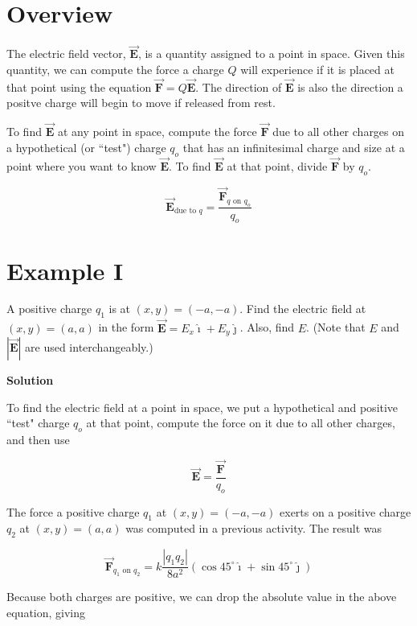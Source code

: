 \documentclass{article}
\newcommand{\ihat}[0]{\hat{\boldsymbol{\imath}}}
\newcommand{\jhat}[0]{\hat{\boldsymbol{\jmath}}}
\newcommand{\bfvec}[1]{\vec{\mathbf{#1}}}
\begin{document}

\section{Overview}

The electric field vector, $\bfvec{E}$, is a quantity assigned to a point in space. Given this quantity, we can compute the force a charge $Q$ will experience if it is placed at that point using the equation $\bfvec{F}=Q\bfvec{E}$. The direction of $\bfvec{E}$ is also the direction a positve charge will begin to move if released from rest.

To find $\bfvec{E}$ at any point in space, 
compute the force $\bfvec{F}$ due to all other charges on a hypothetical (or ``test") charge $q_o$ that has an infinitesimal charge and size at a point where you want to know $\bfvec{E}$. To find $\bfvec{E}$ at that point, divide $\bfvec{F}$ by $q_o$.

$$\bfvec{E}_{\text{due to }q} = \frac{\bfvec{F}_{q\text{ on }q_o}}{q_o}$$


\section{Example I}

A positive charge $q_1$ is at $(x,y)=(-a,-a)$. Find the electric field at $(x,y)=(a,a)$ in the form $\bfvec{E}=E_x\ihat + E_y\jhat$. Also, find $E$. (Note that $E$ and $|\bfvec{E}|$ are used interchangeably.)

\textbf{Solution}

To find the electric field at a point in space, we put a hypothetical and positive ``test" charge $q_o$ at that point, compute the force on it due to all other charges, and then use

$$\bfvec{E} = \frac{\bfvec{F}}{q_o}$$

The force a positive charge $q_1$ at $(x,y)=(-a,-a)$ exerts on a positive charge $q_2$ at $(x,y)=(a, a)$ was computed in a previous activity. The result was

$$\bfvec{F}_{q_1\text{ on } q_2}=k\frac{|q_1q_2|}{8a^2}(\cos 45^\circ \ihat + \sin 45^\circ \jhat)$$

Because both charges are positive, we can drop the absolute value in the above equation, giving
\end{document}
